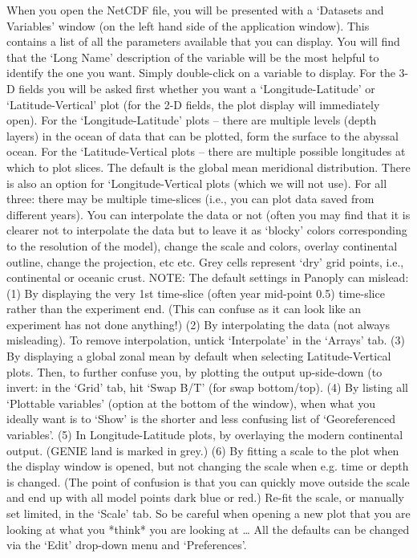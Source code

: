 \documentclass[11pt,fleqn]{book} %
\begin{document}
When you open the NetCDF file, you will be presented with a ‘Datasets and Variables’ window (on the left hand side of the application window). This contains a list of all the parameters available that you can display. You will find that the ‘Long Name’ description of the variable will be the most helpful to identify the one you want. Simply double-click on a variable to display. For the 3-D fields you will be asked first whether you want a ‘Longitude-Latitude’ or ‘Latitude-Vertical’ plot (for the 2-D fields, the plot display will immediately open).
For the ‘Longitude-Latitude’ plots – there are multiple levels (depth layers) in the ocean of data that can be plotted, form the surface to the abyssal ocean.
For the ‘Latitude-Vertical plots – there are multiple possible longitudes at which to plot slices. The default is the global mean meridional distribution. 
There is also an option for ‘Longitude-Vertical plots (which we will not use).
For all three: there may be multiple time-slices (i.e., you can plot data saved from different years).
You can interpolate the data or not (often you may find that it is clearer not to interpolate the data but to leave it as ‘blocky’ colors corresponding to the resolution of the model), change the scale and colors, overlay continental outline, change the projection, etc etc. Grey cells represent ‘dry’ grid points, i.e., continental or oceanic crust.
NOTE: The default settings in Panoply can mislead:
(1) By displaying the very 1st time-slice (often year mid-point 0.5) time-slice rather than the experiment end. (This can confuse as it can look like an experiment has not done anything!)
(2) By interpolating the data (not always misleading). To remove interpolation, untick ‘Interpolate’ in the ‘Arrays’ tab.
(3) By displaying a global zonal mean by default when selecting Latitude-Vertical plots. Then, to further confuse you, by plotting the output up-side-down (to invert: in the ‘Grid’ tab, hit ‘Swap B/T’ (for swap bottom/top). 
(4) By listing all ‘Plottable variables’ (option at the bottom of the window), when what you ideally want is to ‘Show’ is the shorter and less confusing list of ‘Georeferenced variables’. 
(5) In Longitude-Latitude plots, by overlaying the modern continental output. (GENIE land is marked in grey.)
(6) By fitting a scale to the plot when the display window is opened, but not changing the scale when e.g. time or depth is changed. (The point of confusion is that you can quickly move outside the scale and end up with all model points dark blue or red.) Re-fit the scale, or manually set limited, in the ‘Scale’ tab. 
So be careful when opening a new plot that you are looking at what you *think* you are looking at …
All the defaults can be changed via the ‘Edit’ drop-down menu and ‘Preferences’.
\end{document}
